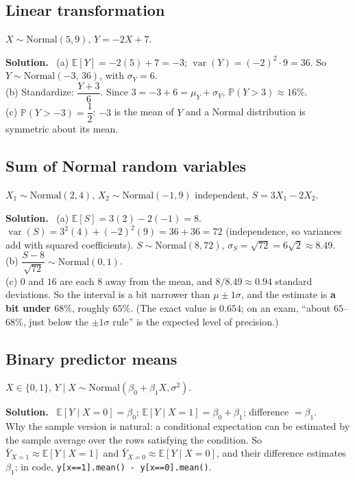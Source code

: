 \documentclass[11pt]{article}
\newcommand{\E}{\mathbb{E}}
\newcommand{\Var}{\operatorname{var}}
\renewcommand{\P}{\mathbb{P}}
\newcommand{\Norm}{\text{Normal}}
\newcommand{\py}[1]{\texttt{#1}}
\newenvironment{soln}{\par\smallskip\noindent\textbf{Solution.}\ }{\par\medskip}
\begin{document}
\subsection*{Linear transformation}
$X\sim\Norm(5,9)$, $Y=-2X+7$.
\begin{soln}
(a) $\E[Y]=-2(5)+7=-3$; $\Var(Y)=(-2)^2\cdot9=36$. So $Y\sim\Norm(-3,\,36)$, with $\sigma_Y=6$.\\
(b) Standardize: $\dfrac{Y+3}6$. Since $3=-3+6=\mu_Y+\sigma_Y$, $\P(Y>3)\approx16\%$.\\
(c) $\P(Y>-3)=\dfrac12$: $-3$ is the mean of $Y$ and a Normal distribution is symmetric about its mean.
\end{soln}

\subsection*{Sum of Normal random variables}
$X_1\sim\Norm(2,4)$, $X_2\sim\Norm(-1,9)$ independent, $S=3X_1-2X_2$.
\begin{soln}
(a) $\E[S]=3(2)-2(-1)=8$. $\Var(S)=3^2(4)+(-2)^2(9)=36+36=72$ (independence, so variances add with squared coefficients). $S\sim\Norm(8,72)$, $\sigma_S=\sqrt{72}=6\sqrt2\approx8.49$.\\
(b) $\dfrac{S-8}{\sqrt{72}}\sim\Norm(0,1)$.\\
(c) $0$ and $16$ are each $8$ away from the mean, and $8/8.49\approx0.94$ standard deviations. So the interval is a bit narrower than $\mu\pm1\sigma$, and the estimate is \textbf{a bit under $68\%$}, roughly $65\%$. (The exact value is $0.654$; on an exam, ``about $65$--$68\%$, just below the $\pm1\sigma$ rule'' is the expected level of precision.)
\end{soln}

\subsection*{Binary predictor means}
$X\in\{0,1\}$, $Y\mid X\sim\Norm(\beta_0+\beta_1X,\sigma^2)$.
\begin{soln}
$\E[Y\mid X{=}0]=\beta_0$; \quad $\E[Y\mid X{=}1]=\beta_0+\beta_1$; \quad difference $=\beta_1$.\\
Why the sample version is natural: a conditional expectation can be estimated by the sample average over the rows satisfying the condition. So $\bar Y_{X=1}\approx\E[Y\mid X{=}1]$ and $\bar Y_{X=0}\approx\E[Y\mid X{=}0]$, and their difference estimates $\beta_1$; in code, \py{y[x==1].mean() - y[x==0].mean()}.
\end{soln}
\end{document}
